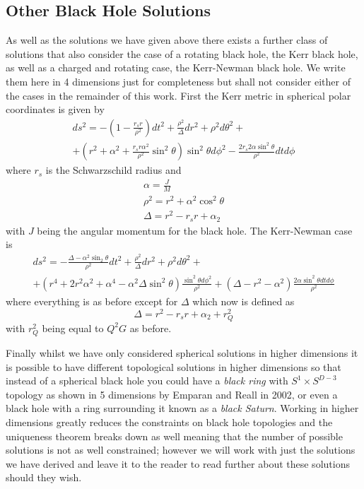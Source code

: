 \documentclass[12pt]{article}
\numberwithin{equation}{section}
\numberwithin{figure}{section}
\begin{document}
\subsection{Other Black Hole Solutions} %
\label{sub:other_black_hole_solutions}
As well as the solutions we have given above there exists a further class of solutions that also consider the case of a rotating black hole, the Kerr black hole, as well as a charged and rotating case, the Kerr-Newman black hole. We write them here in 4 dimensions just for completeness but shall not consider either of the cases in the remainder of this work. First the Kerr metric in spherical polar coordinates is given by
\begin{multline}
	ds^{2}=-\left(1- \frac{r_{s}r}{\rho^{2}}\right)dt^{2}+\frac{\rho^{2}}{\Delta}dr^{2}+\rho^{2}d\theta^{2}+\\
	+\left(r^{2}+\alpha^{2}+\frac{r_{s}r\alpha^{2}}{\rho^{2}}\sin^{2}\theta\right)\sin^{2}\theta d\phi^{2}- \frac{2r_{s}2\alpha\sin^{2}\theta}{\rho^{2}}dtd\phi
\end{multline}
where $r_{s}$ is the Schwarzschild radius and 
\begin{align}
	\alpha=\frac{J}{M}\\
	\rho^{2}=r^{2}+\alpha^{2}\cos^{2}\theta\\
	\Delta=r^{2}-r_{s}r+\alpha_{2}
\end{align}
with $J$ being the angular momentum for the black hole. The Kerr-Newman case is
\begin{multline}
	ds^{2}=-\frac{\Delta-\alpha^{2}\sin_{2}\theta}{\rho^{2}}dt^{2}    +\frac{\rho^{2}}{\Delta}dr^{2}   +\rho^{2}d\theta^{2}+\\
	+(r^{4}+ 2r^{2}\alpha^{2}+ \alpha^{4}- \alpha^{2}\Delta\sin^{2}\theta)\frac{\sin^{2}\theta d\phi^{2}}{\rho^{2}}   + (\Delta -r^{2}-\alpha^{2})\frac{2\alpha\sin^{2}\theta dt d\phi}{\rho^{2}}
\end{multline}
where everything is as before except for $\Delta$ which now is defined as
\begin{equation}
	\Delta=r^{2}-r_{s}r+\alpha_{2} +r^{2}_{Q}
\end{equation}
with $r^{2}_{Q}$ being equal to $Q^{2}G$ as before. 

Finally whilst we have only considered spherical solutions in higher dimensions it is possible to have different topological solutions in higher dimensions so that instead of a spherical black hole you could have a \emph{black ring} with $S^{1}\times S^{D-3}$ topology as shown in 5 dimensions by Emparan and Reall in 2002\cite{Emparan:2001wn}, or even a black hole with a ring surrounding it known as a \emph{black Saturn}. Working in higher dimensions greatly reduces the constraints on black hole topologies and the uniqueness theorem breaks down as well meaning that the number of possible solutions is not as well constrained; however we will work with just the solutions we have derived and leave it to the reader to read further about these solutions should they wish.
\end{document}
